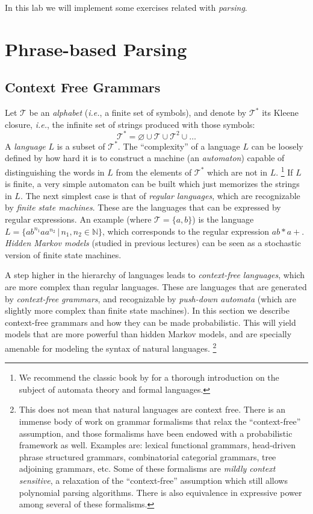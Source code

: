 
In this lab we will implement some exercises related with \emph{parsing}. 

\section{Phrase-based Parsing}

\subsection{Context Free Grammars}

Let $\mathcal{T}$ be an \emph{alphabet} (\emph{i.e.}, a finite set of symbols), and denote by $\mathcal{T}^*$ its Kleene closure, \emph{i.e.}, the 
infinite set of strings produced with those symbols: 
$$\mathcal{T}^* = \varnothing \cup \mathcal{T} \cup \mathcal{T}^2 \cup \ldots$$ 
A \emph{language} $L$ is a subset of $\mathcal{T}^*$. 
The ``complexity'' of a language $L$ can be loosely defined by how hard it is to construct a machine (an \emph{automaton}) capable 
of distinguishing the words in $L$ from the elements of   $\mathcal{T}^*$ which are not in $L$.%
\footnote{We recommend the classic book by \citet{Hopcroft1979} for a thorough introduction on the subject of 
automata theory and formal languages.} %
If $L$ is finite, a very simple automaton can be built which just memorizes the strings in $L$. 
The next simplest case is that of \emph{regular languages}, which are recognizable by \emph{finite state machines}. 
These are the languages that can be expressed by regular expressions. 
An example (where $\mathcal{T} = \{a,b\}$) is the language $L = \{ab^{n_1}aa^{n_2} \,|\,n_1,n_2 \in \mathbb{N}\}$, which corresponds to 
the regular expression $ab*a+$. 
\emph{Hidden Markov models} (studied in previous lectures) can be seen as a stochastic version of finite state machines.  

A step higher in the hierarchy of languages leads to \emph{context-free languages}, which are more complex than regular languages. 
These are languages that are generated by \emph{context-free grammars}, and recognizable by \emph{push-down automata} 
(which are slightly more complex than finite state machines). In this section we describe context-free grammars and how 
they can be made probabilistic. This will yield models that are more powerful than hidden Markov models, and are 
specially amenable for modeling the syntax of natural languages.%
\footnote{This does not mean that natural languages are context free. There is an immense body of work on grammar formalisms that 
relax the ``context-free'' assumption, and those formalisms have been endowed with a probabilistic framework as well. Examples are: 
lexical functional grammars, head-driven phrase structured grammars, combinatorial categorial grammars, tree adjoining grammars, etc. Some 
of these formalisms are \emph{mildly context sensitive}, a relaxation of the ``context-free'' assumption which still allows polynomial parsing 
algorithms. There is also equivalence in expressive power among several of these formalisms.} %

